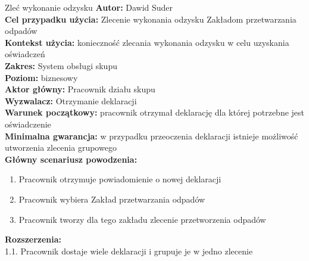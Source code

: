 	\begin{usecase}{Zleć wykonanie odzysku}
		\textbf{Autor:} Dawid Suder \\
		\textbf{Cel przypadku użycia:} Zlecenie wykonania odzysku Zakładom przetwarzania odpadów \\
		\textbf{Kontekst użycia:} konieczność zlecania wykonania odzysku w celu uzyskania oświadczeń \\
		\textbf{Zakres:} System obsługi skupu \\
		\textbf{Poziom:} biznesowy \\
		\textbf{Aktor główny:} Pracownik działu skupu\\
		\textbf{Wyzwalacz:} Otrzymanie deklaracji \\
		\textbf{Warunek początkowy:} pracownik otrzymał deklarację dla której potrzebne jest oświadczenie \\
		\textbf{Minimalna gwarancja:} w przypadku przeoczenia deklaracji istnieje możliwość utworzenia zlecenia grupowego \\
		\textbf{Główny scenariusz powodzenia:} \\
			\begin{enumerate}
				\item Pracownik otrzymuje powiadomienie o nowej deklaracji
				\item Pracownik wybiera Zakład przetwarzania odpadów
				\item Pracownik tworzy dla tego zakładu zlecenie przetworzenia odpadów
			\end{enumerate}
		\textbf{Rozszerzenia:} \\
				1.1. Pracownik dostaje wiele deklaracji i grupuje je w jedno zlecenie
	\end{usecase}

